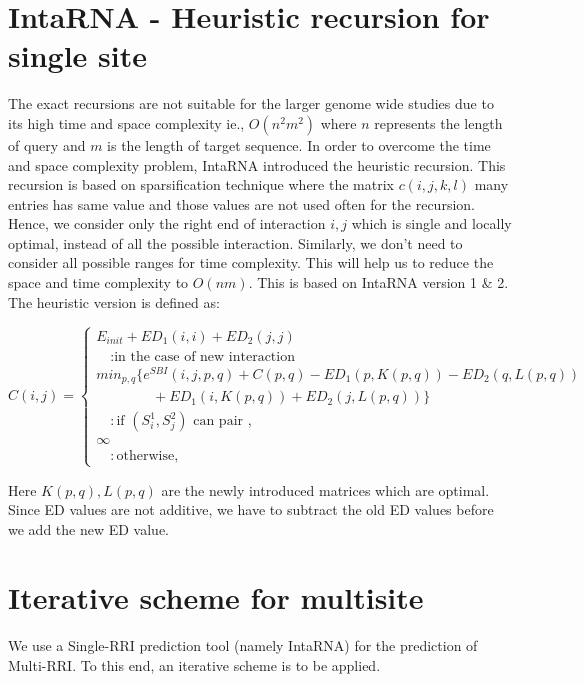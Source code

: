\documentclass[twoside,a4paper]{report}
\begin{document}
	
	
	\section{IntaRNA -  Heuristic recursion for single site}
	
	The exact recursions are not suitable for the larger genome wide studies due to its high time and space complexity ie., $O(n^2m^2)$	where $n$ represents the length of query and $m$ is the length of target sequence. In order to overcome the time and space complexity problem, IntaRNA introduced the heuristic recursion. This recursion is based on sparsification technique where the matrix $c(i,j,k,l)$ many entries has same value and those values are not used often for the recursion. Hence, we consider only the right end of interaction $i, j$  which is single and locally optimal, instead of all the possible interaction. Similarly, we don't need to consider all possible ranges for time complexity. This will help us to reduce the space and time complexity to $O(nm)$. This is based on IntaRNA version 1 \& 2. The heuristic version is defined as:
	
	\begin{equation}
	C(i,j) =  \begin{cases}
	E_{init} + ED_1(i, i) + ED_2(j, j) \\
	\quad 	: \text{in the case of new interaction}\\
	min_{p,q}\{ e^{SBI}(i,j,p,q)+ C(p,q) - ED_1(p,K(p,q)) - ED_2(q,L(p,q))\\
	\quad \quad \quad \quad + ED_1(i,K(p,q)) + ED_2(j,L(p,q))\} \\
	\quad 	: \text{if $(S_i^1 , S_j^2 )$ can pair },\\
	\infty \\
	\quad : \text{otherwise},
	\end{cases}
	\end{equation}
	
	Here $K(p,q) , L(p,q)$ are the newly introduced matrices which are optimal. Since ED values are not additive, we have to subtract the old ED values before we add the new ED value.
	
	\section{Iterative scheme for multisite}
	 We use a Single-RRI prediction tool (namely IntaRNA) for the prediction of Multi-RRI. To this end, an iterative scheme is to be applied.
	
\end{document}
